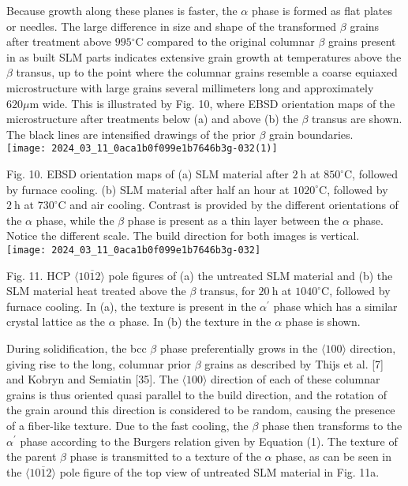 \documentclass[10pt]{article}
\begin{document}
Because growth along these planes is faster, the $\alpha$ phase is formed as flat plates or needles. The large difference in size and shape of the transformed $\beta$ grains after treatment above $995{ }^{\circ} \mathrm{C}$ compared to the original columnar $\beta$ grains present in as built SLM parts indicates extensive grain growth at temperatures above the $\beta$ transus, up to the point where the columnar grains resemble a coarse equiaxed microstructure with large grains several millimeters long and approximately $620 \mu \mathrm{m}$ wide. This is illustrated by Fig. 10, where EBSD orientation maps of the microstructure after treatments below (a) and above (b) the $\beta$ transus are shown. The black lines are intensified drawings of the prior $\beta$ grain boundaries.\\
\texttt{[image: 2024\_03\_11\_0aca1b0f099e1b7646b3g-032(1)]}

Fig. 10. EBSD orientation maps of (a) SLM material after $2 \mathrm{~h}$ at $850^{\circ} \mathrm{C}$, followed by furnace cooling. (b) SLM material after half an hour at $1020^{\circ} \mathrm{C}$, followed by $2 \mathrm{~h}$ at $730^{\circ} \mathrm{C}$ and air cooling. Contrast is provided by the different orientations of the $\alpha$ phase, while the $\beta$ phase is present as a thin layer between the $\alpha$ phase. Notice the different scale. The build direction for both images is vertical.\\
\texttt{[image: 2024\_03\_11\_0aca1b0f099e1b7646b3g-032]}

Fig. 11. HCP $\langle 10 \overline{1} 2\rangle$ pole figures of (a) the untreated SLM material and (b) the SLM material heat treated above the $\beta$ transus, for $20 \mathrm{~h}$ at $1040^{\circ} \mathrm{C}$, followed by furnace cooling. In (a), the texture is present in the $\alpha^{\prime}$ phase which has a similar crystal lattice as the $\alpha$ phase. In (b) the texture in the $\alpha$ phase is shown.

During solidification, the bcc $\beta$ phase preferentially grows in the $\langle 100\rangle$ direction, giving rise to the long, columnar prior $\beta$ grains as described by Thijs et al. [7] and Kobryn and Semiatin [35]. The $\langle 100\rangle$ direction of each of these columnar grains is thus oriented quasi parallel to the build direction, and the rotation of the grain around this direction is considered to be random, causing the presence of a fiber-like texture. Due to the fast cooling, the $\beta$ phase then transforms to the $\alpha^{\prime}$ phase according to the Burgers relation given by Equation (1). The texture of the parent $\beta$ phase is transmitted to a texture of the $\alpha$ phase, as can be seen in the $\langle 10 \overline{1} 2\rangle$ pole figure of the top view of untreated SLM material in Fig. 11a.
\end{document}
